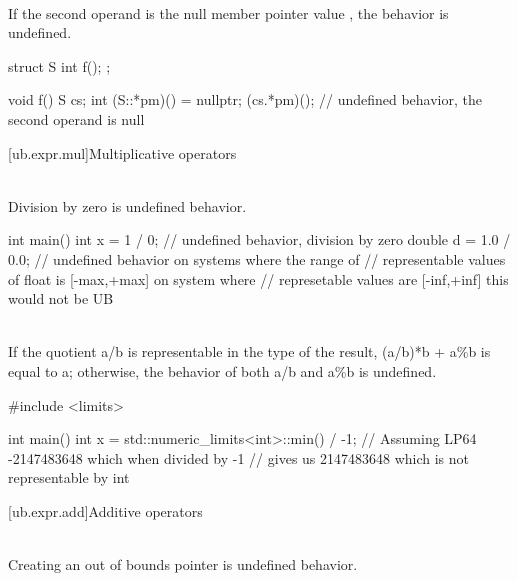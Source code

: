 \pnum
{} \\
If the second operand is the null
member pointer value , the behavior is undefined.

\pnum
\begin{example}
\begin{codeblock}
struct S {
  int f();
};

void f() {
  S cs;
  int (S::*pm)() = nullptr;
  (cs.*pm)();           // undefined behavior, the second operand is null
}
\end{codeblock}
\end{example}


[ub.expr.mul]{Multiplicative operators}

\pnum
{} \\
Division by zero is undefined behavior.

\pnum
\begin{example}
\begin{codeblock}
int main() {
  int x = 1 / 0;        // undefined behavior, division by zero
  double d = 1.0 / 0.0; // undefined behavior on systems where the range of
                        // representable values of float is [-max,+max] on system where
                        // represetable values are [-inf,+inf] this would not be UB
}
\end{codeblock}
\end{example}

\pnum
{} \\
If the
quotient a/b is representable in the type of the result, (a/b)*b + a\%b is equal to a; otherwise, the behavior
of both a/b and a\%b is undefined.

\pnum
\begin{example}
\begin{codeblock}
#include <limits>

int main() {
  int x =
      std::numeric_limits<int>::min() / -1; // Assuming LP64 -2147483648 which when divided by -1
                                            // gives us 2147483648 which is not representable by int
}
\end{codeblock}
\end{example}

[ub.expr.add]{Additive operators}

\pnum
{} \\
Creating an out of bounds pointer is undefined behavior.

